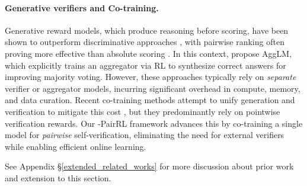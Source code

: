 \paragraph{Generative verifiers and Co-training.} Generative reward models, which produce reasoning before scoring, have been shown to outperform discriminative approaches \citep{mahan2024generative, zhang2025generativeverifiersrewardmodeling}, with pairwise ranking often proving more effective than absolute scoring \citep{jiang2023llmblender, toshniwal2025genselect}. In this context, \citet{zhao2025majority} propose AggLM, which explicitly trains an aggregator via RL to synthesize correct answers for improving majority voting. However, these approaches typically rely on \textit{separate} verifier or aggregator models, incurring significant overhead in compute, memory, and data curation. Recent co-training methods attempt to unify generation and verification to mitigate this cost \citep{sareen2025puttingvaluerlbetter, liu2025trustverifyselfverificationapproach, wang2025coevolvingllmcoderunit}, but they predominantly rely on pointwise verification rewards. Our \method{}-PairRL framework advances this by co-training a single model for \textit{pairwise} self-verification, eliminating the need for external verifiers while enabling efficient online learning.

See Appendix \S\ref{extended_related_works} for more discussion about prior work and extension to this section.

